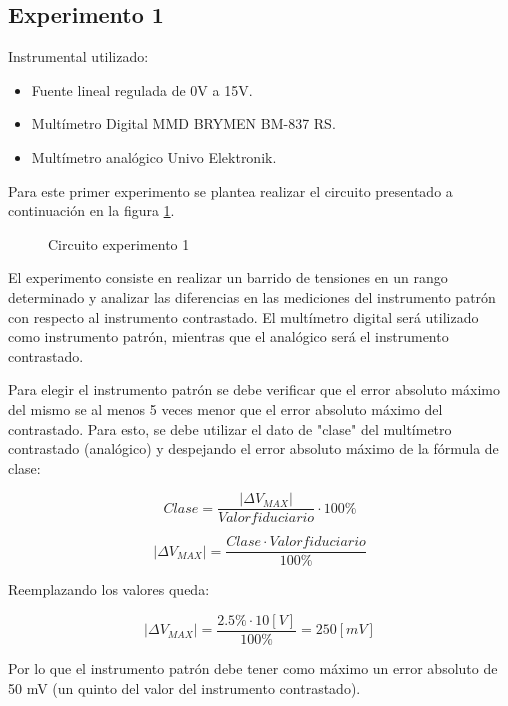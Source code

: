 \subsection{Experimento 1}

Instrumental utilizado:

\begin{itemize}
    \item Fuente lineal regulada de 0V a 15V.
    \item Multímetro Digital MMD BRYMEN BM-837 RS.
    \item Multímetro analógico Univo Elektronik.
\end{itemize}


Para este primer experimento se plantea realizar el circuito presentado a continuación en la figura \ref{fig:circuitoexp1}. 

\begin{figure}[H]
    \centering
    
    \caption{Circuito experimento 1}
    \label{fig:circuitoexp1}
\end{figure}

El experimento consiste en realizar un barrido de tensiones en un rango determinado y analizar las diferencias en las mediciones del instrumento patrón con respecto al instrumento contrastado. El multímetro digital será utilizado como instrumento patrón, mientras que el analógico será el instrumento contrastado. 

Para elegir el instrumento patrón se debe verificar que el error absoluto máximo del mismo se al menos 5 veces menor que el error absoluto máximo del contrastado. Para esto, se debe utilizar el dato de "clase" del multímetro contrastado (analógico) y despejando el error absoluto máximo de la fórmula de clase:

\begin{equation}\label{eq::clase}
    Clase= \frac{|\Delta V_{MAX}|}{Valor fiduciario}\cdot 100\%
\end{equation}

\begin{equation}
    |\Delta V_{MAX}|= \frac{Clase \cdot Valor fiduciario}{100\%}
\end{equation}

Reemplazando los valores queda:

\begin{equation}
    |\Delta V_{MAX}|= \frac{2.5\% \cdot 10[V]}{100\%}= 250[mV]
\end{equation}

Por lo que el instrumento patrón debe tener como máximo un error absoluto de 50 mV (un quinto del valor del instrumento contrastado). 

